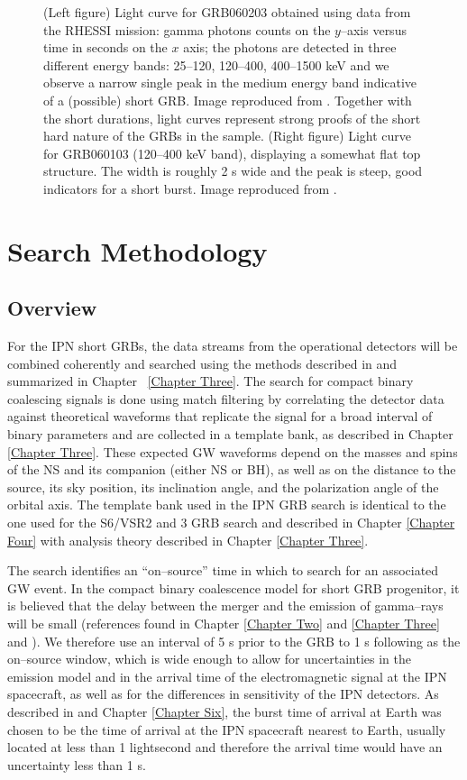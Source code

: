 \begin{figure}[ht!]
\caption{(Left figure) Light curve for GRB060203 obtained using data from the RHESSI mission: gamma photons counts on the $y$--axis versus time in seconds on the $x$ axis; the photons are detected in three different energy bands: 25--120, 120--400, 400--1500 keV and we observe a narrow single peak in the medium energy band indicative of a (possible) short GRB. Image reproduced from \cite{heasarc}. Together with the short durations, light curves represent strong proofs of the short hard nature of the GRBs in the sample. (Right figure) Light curve for GRB060103 (120--400 keV band), displaying a somewhat flat top structure. The width is roughly 2 s wide and the peak is steep, good indicators for a short burst. Image reproduced from \cite{integral}.}
\label{two_light_curves}
\end{figure}

\section{Search Methodology}
\label{sec:method}

\subsection{Overview}
For the IPN short GRBs, the data streams from the operational detectors will be combined coherently and searched using the methods described in \cite{Harry:2010fr} and summarized in Chapter ~\ref{Chapter Three}. The search for compact binary coalescing signals is done using match filtering \cite{OwenSathyaprakash98} by correlating the detector data against theoretical waveforms that replicate the signal for a broad interval of binary parameters and are collected in a template bank, as described in Chapter \ref{Chapter Three}. These expected GW waveforms depend on the masses and spins of the NS and its companion (either NS or BH), as well as on the distance to the source, its sky position, its inclination angle, and the polarization angle of the orbital axis. The template bank used in the IPN GRB search is identical to the one used for the S6/VSR2 and 3 GRB search \cite{lvc:s6grb} and described in Chapter \ref{Chapter Four} with analysis theory described in Chapter \ref{Chapter Three}. 

The search identifies an ``on--source''  time in which to search for an associated GW event. In the compact binary coalescence model for short GRB progenitor, it is believed that the delay between the merger and the emission of gamma--rays will be small (references found in Chapter \ref{Chapter Two} and \ref{Chapter Three} and \cite{lvc:s6grb}). We therefore use an interval of 5 s prior to the GRB to 1 s following as the on--source window, which is wide enough to allow for uncertainties in the emission model and in the arrival time of the electromagnetic signal at the IPN spacecraft, as well as for the differences in sensitivity of the IPN detectors. As described in \cite{Predoi:2011aa} and Chapter \ref{Chapter Six}, the burst time of arrival at Earth was chosen to be the time of arrival at the IPN spacecraft nearest to Earth, usually located at less than 1 lightsecond and therefore the arrival time would have an uncertainty less than 1 s. 

